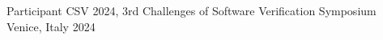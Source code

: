 
\begin{cvhonors}

  \cvhonor
	{Participant}
	{CSV 2024, 3rd Challenges of Software Verification Symposium}
	{Venice, Italy} %
	{2024} %

\end{cvhonors}
